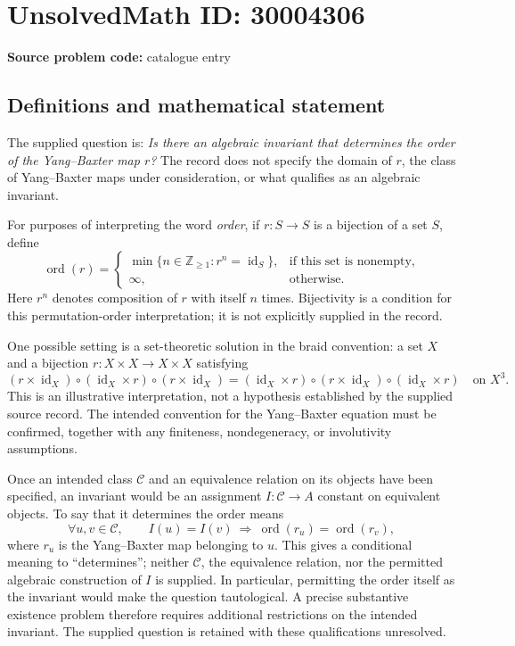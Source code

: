 \documentclass[11pt]{article}
\newcommand{\Z}{\mathbb{Z}}
\begin{document}
\section*{UnsolvedMath ID: 30004306}
\textbf{Source problem code:} catalogue entry
\subsection{Definitions and mathematical statement}
The supplied question is: \emph{Is there an algebraic invariant that determines the order of the Yang--Baxter map \(r\)?} The record does not specify the domain of \(r\), the class of Yang--Baxter maps under consideration, or what qualifies as an algebraic invariant.

For purposes of interpreting the word \emph{order}, if \(r\colon S\to S\) is a bijection of a set \(S\), define
\[
\operatorname{ord}(r)=
\begin{cases}
\min\{n\in\Z_{\geq 1}:r^n=\operatorname{id}_S\},&\text{if this set is nonempty},\\
\infty,&\text{otherwise}.
\end{cases}
\]
Here \(r^n\) denotes composition of \(r\) with itself \(n\) times. Bijectivity is a condition for this permutation-order interpretation; it is not explicitly supplied in the record.

One possible setting is a set-theoretic solution in the braid convention: a set \(X\) and a bijection \(r\colon X\times X\to X\times X\) satisfying
\[
(r\times\operatorname{id}_X)\circ(\operatorname{id}_X\times r)\circ(r\times\operatorname{id}_X)
=
(\operatorname{id}_X\times r)\circ(r\times\operatorname{id}_X)\circ(\operatorname{id}_X\times r)
\quad\text{on }X^3.
\]
This is an illustrative interpretation, not a hypothesis established by the supplied source record. The intended convention for the Yang--Baxter equation must be confirmed, together with any finiteness, nondegeneracy, or involutivity assumptions.

Once an intended class \(\mathcal C\) and an equivalence relation on its objects have been specified, an invariant would be an assignment \(I\colon\mathcal C\to A\) constant on equivalent objects. To say that it determines the order means
\[
\forall u,v\in\mathcal C,\qquad
I(u)=I(v)\ \Longrightarrow\ \operatorname{ord}(r_u)=\operatorname{ord}(r_v),
\]
where \(r_u\) is the Yang--Baxter map belonging to \(u\). This gives a conditional meaning to ``determines''; neither \(\mathcal C\), the equivalence relation, nor the permitted algebraic construction of \(I\) is supplied. In particular, permitting the order itself as the invariant would make the question tautological. A precise substantive existence problem therefore requires additional restrictions on the intended invariant. The supplied question is retained with these qualifications unresolved.
\end{document}
